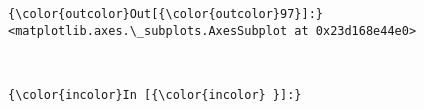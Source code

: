 \documentclass[11pt]{article}
\begin{document}
            \begin{Verbatim}[commandchars=\\\{\}]
{\color{outcolor}Out[{\color{outcolor}97}]:} <matplotlib.axes.\_subplots.AxesSubplot at 0x23d168e44e0>
\end{Verbatim}
        
    \begin{center}
    \end{center}
    { \hspace*{\fill} \\}
    
    \begin{Verbatim}[commandchars=\\\{\}]
{\color{incolor}In [{\color{incolor} }]:} 
\end{Verbatim}


    
    
    
    
\end{document}
